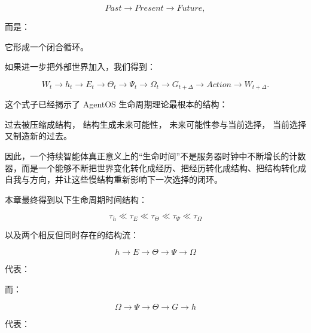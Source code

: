 \[
Past
\rightarrow
Present
\rightarrow
Future,
\]

而是：

\begin{statementbox}
\centering
{}
\end{statementbox}

它形成一个闭合循环。

如果进一步把外部世界加入，我们得到：

\[
W_t
\rightarrow
h_t
\rightarrow
E_t
\rightarrow
\Theta_t
\rightarrow
\Psi_t
\rightarrow
\Omega_t
\rightarrow
G_{t+\Delta}
\rightarrow
Action
\rightarrow
W_{t+\Delta}.
\]

这个式子已经揭示了 AgentOS 生命周期理论最根本的结构：

\begin{statementbox}
过去被压缩成结构，
结构生成未来可能性，
未来可能性参与当前选择，
当前选择又制造新的过去。
\end{statementbox}

因此，一个持续智能体真正意义上的“生命时间”不是服务器时钟中不断增长的计数器，而是一个能够不断把世界变化转化成经历、把经历转化成结构、把结构转化成自我与方向，并让这些慢结构重新影响下一次选择的闭环。

本章最终得到以下生命周期时间结构：

\[
\boxed{
\tau_h
\ll
\tau_E
\ll
\tau_\Theta
\ll
\tau_\Psi
\ll
\tau_\Omega
}
\]

以及两个相反但同时存在的结构流：

\[
\boxed{
h
\rightarrow
E
\rightarrow
\Theta
\rightarrow
\Psi
\rightarrow
\Omega
}
\]

代表：

\begin{statementbox}
\centering
{}
\end{statementbox}

而：

\[
\boxed{
\Omega
\rightarrow
\Psi
\rightarrow
\Theta
\rightarrow
G
\rightarrow
h
}
\]

代表：

\begin{statementbox}
\centering
{}
\end{statementbox}

